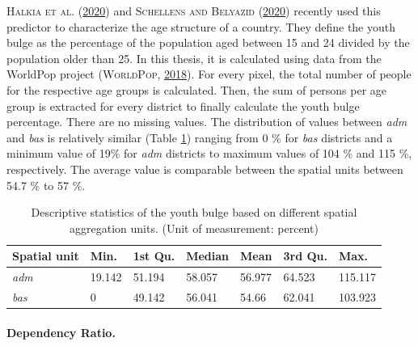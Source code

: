 \documentclass[a4paper,11pt]{article}
\begin{document}
\textsc{\textnormal{Halkia} \textnormal{et al.}} \textsc{(\textnormal{\protect\hyperlink{ref-halkia2020a}{2020}})} and \textsc{\textnormal{Schellens} and \textnormal{Belyazid}} \textsc{(\textnormal{\protect\hyperlink{ref-schellens2020}{2020}})} recently used this predictor to characterize
the age structure of a country. They define the youth bulge as the percentage of
the population aged between 15 and 24 divided by the population older than 25.
In this thesis, it is calculated using data from the WorldPop project \textsc{(\textnormal{\textsc{WorldPop}}, \textnormal{\protect\hyperlink{ref-worldpop2018}{2018}})}.
For every pixel, the total number of people for the respective age groups is calculated.
Then, the sum of persons per age group is extracted for every district to finally
calculate the youth bulge percentage. There are no missing values. The distribution
of values between \emph{adm} and \emph{bas} is relatively similar (Table \ref{tab:02-data-ybulge})
ranging from 0 \% for \emph{bas} districts and a minimum value of 19\% for \emph{adm} districts
to maximum values of 104 \% and 115 \%, respectively. The average value is comparable
between the spatial units between 54.7 \% to 57 \%.
\begin{table}[H]

\caption[Descriptive statistics of the youth bulge.]{\label{tab:02-data-ybulge}Descriptive statistics of the youth bulge based on different spatial
               aggregation units. (Unit of measurement: percent)}
\centering
\fontsize{10}{12}\selectfont
\begin{tabular}[t]{lllllll}
\toprule
Spatial unit & Min. & 1st Qu. & Median & Mean & 3rd Qu. & Max.\\
\midrule
\textit{adm} & 19.142 & 51.194 & 58.057 & 56.977 & 64.523 & 115.117\\
\textit{bas} & 0 & 49.142 & 56.041 & 54.66 & 62.041 & 103.923\\
\bottomrule
\end{tabular}
\end{table}
\hypertarget{dependency-ratio.}{%
\paragraph{Dependency Ratio.}\label{dependency-ratio.}}
\end{document}
